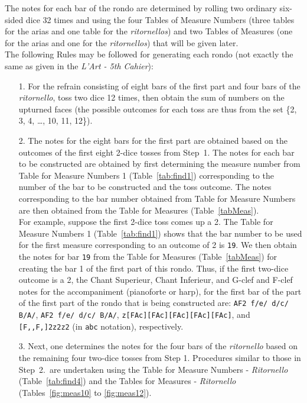 \documentclass[a4paper,x11names,svgnames,10pt]{article}
\begin{document}
{The notes for each bar of the rondo are determined by rolling two ordinary six-sided dice 32 times and using the four Tables of Measure Numbers (three tables for the arias and one table for the {\it ritornellos}) and two Tables of Measures (one for the arias and one for the {\it ritornellos}) that will be  given later.\\

The following Rules may be followed for generating each rondo (not exactly the same as given in the {\em L'Art - 5th Cahier}):

\begin{enumerate}
	\item [1.\label{step1}] For the refrain consisting of eight bars of the first part and four bars of the {\it ritornello}, toss two dice 12 times, then obtain the sum of numbers on the upturned faces (the possible outcomes for each toss are thus from the set \{2, 3, 4, \ldots, 10, 11, 12\}). 
	
	\item [2.\label{step2}] The notes for the eight bars for the first part are obtained based on the outcomes of the first eight 2-dice tosses from Step~1.  The notes for each bar to be constructed are obtained by first determining the measure number from Table for Measure Numbers 1 (Table~\ref{tab:find1}) corresponding to the number of the bar to be constructed and the toss outcome.  The notes corresponding to the bar number  obtained from Table for Measure Numbers are then obtained from the Table for Measures (Table~\ref{tabMeas}).\\
	For example, suppose the first 2-dice toss comes up a 2.  The Table for Measure Numbers 1 (Table~\ref{tab:find1}) shows that the bar number to be used for the first measure corresponding to an outcome of 2 is {\tt 19}.  We then obtain the notes for bar {\tt 19} from the Table for Measures (Table~\ref{tabMeas}) for creating the bar 1 of the first part of this rondo.  Thus, if the first two-dice outcome is a 2, the Chant Superieur, Chant Inferieur, and G-clef and F-clef notes for the accompaniment (pianoforte or harp), for the first bar of the part of the first part of the rondo that is being constructed are: {\tt AF2 f/e/ d/c/ B/A/}, {\tt AF2 f/e/ d/c/ B/A/}, {\tt z[FAc][FAc][FAc][FAc][FAc]}, and {\tt [F,,F,]2z2z2} (in {\tt abc} notation), respectively. 

	\item[3.\label{step3}] Next, one determines the notes for the  four bars of the {\it ritornello} based on the  remaining four two-dice tosses from Step 1. Procedures similar to those in Step~2.\ are undertaken using the Table for Measure Numbers - {\it Ritornello} (Table~\ref{tab:find4}) and the Tables for Measures - {\it Ritornello} (Tables~\ref{fig:meas10} to \ref{fig:meas12}).
	

\end{enumerate}}
\end{document}
